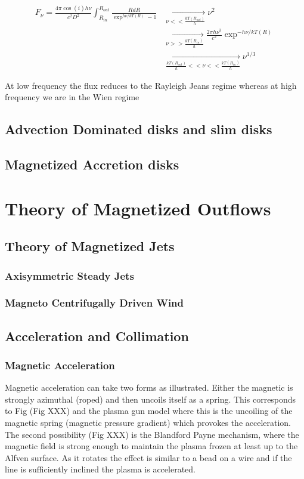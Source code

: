\documentclass[10pt,a4paper,english]{article}
\begin{document}
\begin{align}
    F_{\nu} = \frac{4\pi \cos (i)h\nu}{c^2D^2} \int_{R_{in}}^{R_{out}}
    \frac{RdR}{\exp^{h\nu/kT(R)}-1}
    &\xrightarrow[\nu << \frac{kT(R_{out})}{h}]{} \nu^2  \\
    & \xrightarrow[\nu >> \frac{kT(R_{in})}{h}]{} \frac{2\pi h \nu^3}{c^2}\exp ^{-h\nu/kT(R)}  \\
    & \xrightarrow[\frac{kT(R_{out})}{h}<<\nu << \frac{kT(R_{in})}{h}]{} \nu^{1/3}
\end{align}


At low frequency the flux reduces to the Rayleigh Jeans regime whereas at
high frequency we are in the Wien regime


\subsection{Advection Dominated disks and slim disks}
\subsection{Magnetized Accretion disks}

\section{Theory of Magnetized Outflows}
\subsection{Theory of Magnetized Jets}
\subsubsection{Axisymmetric Steady Jets}
\subsubsection{Magneto Centrifugally Driven Wind}
\subsection{Acceleration and Collimation}
\subsubsection{Magnetic Acceleration}

Magnetic acceleration can take two forms as illustrated. Either the magnetic is strongly
azimuthal (roped) and then uncoils itself as a spring. This corresponds to Fig (Fig XXX)
and the plasma gun model where this is the uncoiling of the magnetic spring (magnetic pressure gradient)
which provokes the acceleration. The second possibility (Fig XXX) is the Blandford Payne mechanism, where the magnetic field
is strong enough to maintain the plasma frozen at least up to the Alfven surface. As it rotates the effect is similar to a bead
on a wire and if the line is sufficiently inclined the plasma is accelerated.
\end{document}
